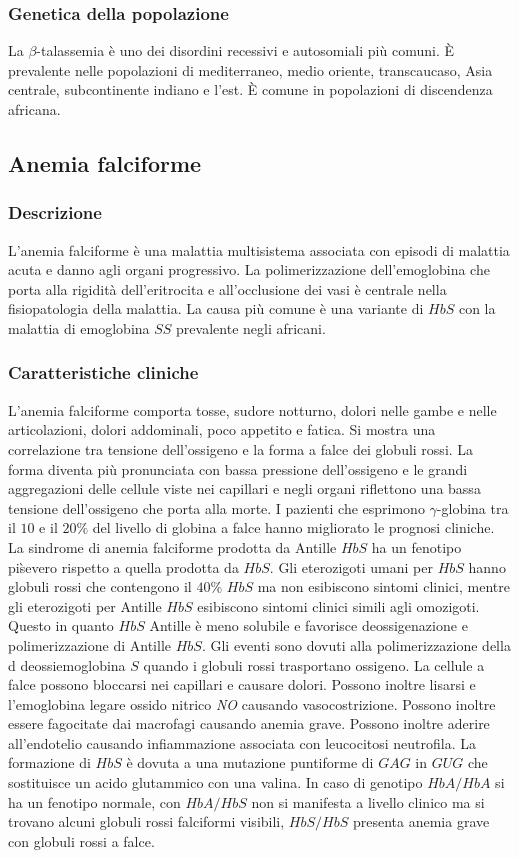 \subsubsection{Genetica della popolazione}
La $\beta$-talassemia \`e uno dei disordini recessivi e autosomiali pi\`u comuni. \`E prevalente nelle popolazioni di mediterraneo, medio oriente, transcaucaso, Asia centrale, 
subcontinente indiano e l'est. \`E comune in popolazioni di discendenza africana. 
\subsection{Anemia falciforme}
\subsubsection{Descrizione}
L'anemia falciforme \`e una malattia multisistema associata con episodi di malattia acuta e danno agli organi progressivo. La polimerizzazione dell'emoglobina che porta 
alla rigidit\`a dell'eritrocita e all'occlusione dei vasi \`e centrale nella fisiopatologia della malattia. La causa pi\`u comune \`e una variante di $HbS$ con la malattia di emoglobina
$SS$ prevalente negli africani. 
\subsubsection{Caratteristiche cliniche}
L'anemia falciforme comporta tosse, sudore notturno, dolori nelle gambe e nelle articolazioni, dolori addominali, poco appetito e fatica. Si mostra una correlazione tra tensione 
dell'ossigeno e la forma a falce dei globuli rossi. La forma diventa pi\`u pronunciata con bassa pressione dell'ossigeno e le grandi aggregazioni delle cellule viste nei capillari 
e negli organi riflettono una bassa tensione dell'ossigeno che porta alla morte. I pazienti che esprimono $\gamma$-globina tra il $10$ e il $20\%$ del livello di globina a falce 
hanno migliorato le prognosi cliniche. La sindrome di anemia falciforme prodotta da Antille $HbS$ ha un fenotipo pi\` severo rispetto a quella prodotta da $HbS$. Gli eterozigoti umani
per $HbS$  hanno globuli rossi che contengono il $40\%$ $HbS$ ma non esibiscono sintomi clinici, mentre gli eterozigoti per Antille $HbS$ esibiscono sintomi clinici simili agli 
omozigoti. Questo in quanto $HbS$ Antille \`e meno solubile e favorisce deossigenazione e polimerizzazione di Antille $HbS$. Gli eventi sono dovuti alla polimerizzazione della d
deossiemoglobina $S$ quando i globuli rossi trasportano ossigeno. La cellule a falce possono bloccarsi nei capillari e causare dolori. Possono inoltre lisarsi e l'emoglobina legare
ossido nitrico \emph{NO} causando vasocostrizione. Possono inoltre essere fagocitate dai macrofagi causando anemia grave. Possono inoltre aderire all'endotelio causando infiammazione
associata con leucocitosi neutrofila. La formazione di $HbS$ \`e dovuta a una mutazione puntiforme di $GAG$ in $GUG$ che sostituisce un acido glutammico con una valina. In caso di
genotipo $HbA/HbA$ si ha un fenotipo normale, con $HbA/HbS$ non si manifesta a livello clinico ma si trovano alcuni globuli rossi falciformi visibili, $HbS/HbS$ presenta anemia grave
con globuli rossi a falce. 
